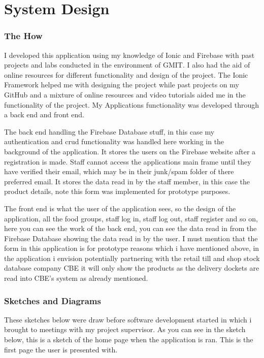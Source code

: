 \chapter{System Design}

\subsection{The How}
I developed this application using my knowledge of Ionic and Firebase with past projects and labs conducted in the environment of GMIT. I also had the aid of online resources for different functionality and design of the project. The Ionic Framework helped me with designing the project while past projects on my GitHub and a mixture of online resources and video tutorials aided me in the functionality of the project. My Applications functionality was developed through a back end and front end. 
\newline

The back end handling the Firebase Database stuff, in this case my authentication and crud functionality was handled here working in the background of the application. It stores the users on the Firebase website after a registration is made. Staff cannot access the applications main frame until they have verified their email, which may be in their junk/spam folder of there preferred email. It stores the data read in by the staff member, in this case the product details, note this form was implemented for prototype purposes.
\newline 

The front end is what the user of the application sees, so the design of the application, all the food groups, staff log in, staff log out, staff register and so on, here you can see the work of the back end, you can see the data read in from the Firebase Database showing the data read in by the user. I must mention that the form in this application is for prototype reasons which i have mentioned above, in the application i envision potentially partnering with the retail till and shop stock database company CBE it will only show the products as the delivery dockets are read into CBE's system as already mentioned. 
\newpage
\subsection{Sketches and Diagrams}
These sketches below were draw before software development started in which i brought to meetings with my project supervisor. 
\newline
As you can see in the sketch below, this is a sketch of the home page when the application is ran. This is the first page the user is presented with.

